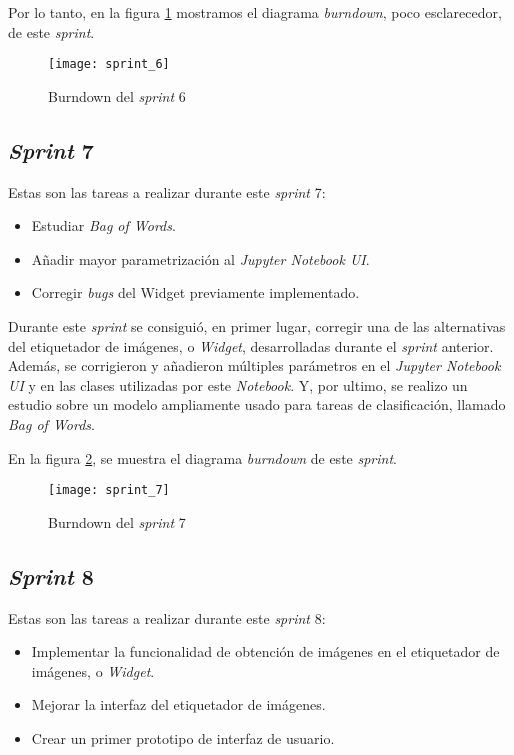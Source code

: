 Por lo tanto, en la figura \ref{fig:A.1.7} mostramos el diagrama \textit{burndown}, poco esclarecedor, de este \textit{sprint}.

\begin{figure}
\centering
\texttt{[image: sprint\_6]}
\caption{Burndown del \textit{sprint} 6}
\label{fig:A.1.7}
\end{figure}



\subsection{\textit{Sprint} 7}
Estas son las tareas a realizar durante este \textit{sprint} 7:

\begin{itemize}
	\item Estudiar \textit{Bag of Words}.
	\item Añadir mayor parametrización al \textit{Jupyter Notebook UI}.
	\item Corregir \textit{bugs} del Widget previamente implementado.
\end{itemize}

Durante este \textit{sprint} se consiguió, en primer lugar, corregir una de las alternativas del etiquetador de imágenes, o \textit{Widget}, desarrolladas durante el \textit{sprint} anterior. Además, se corrigieron y añadieron múltiples parámetros en el \textit{Jupyter Notebook UI} y en las clases utilizadas por este \textit{Notebook}. Y, por ultimo, se realizo un estudio sobre un modelo ampliamente usado para tareas de clasificación, llamado \textit{Bag of Words}.

En la figura \ref{fig:A.1.8}, se muestra el diagrama \textit{burndown} de este \textit{sprint}.

\begin{figure}
\centering
\texttt{[image: sprint\_7]}
\caption{Burndown del \textit{sprint} 7}
\label{fig:A.1.8}
\end{figure}


\subsection{\textit{Sprint} 8}
Estas son las tareas a realizar durante este \textit{sprint} 8:

\begin{itemize}
	\item Implementar la funcionalidad de obtención de imágenes en el etiquetador de imágenes, o \textit{Widget}.
	\item Mejorar la interfaz del etiquetador de imágenes.
	\item Crear un primer prototipo de interfaz de usuario.
\end{itemize}

